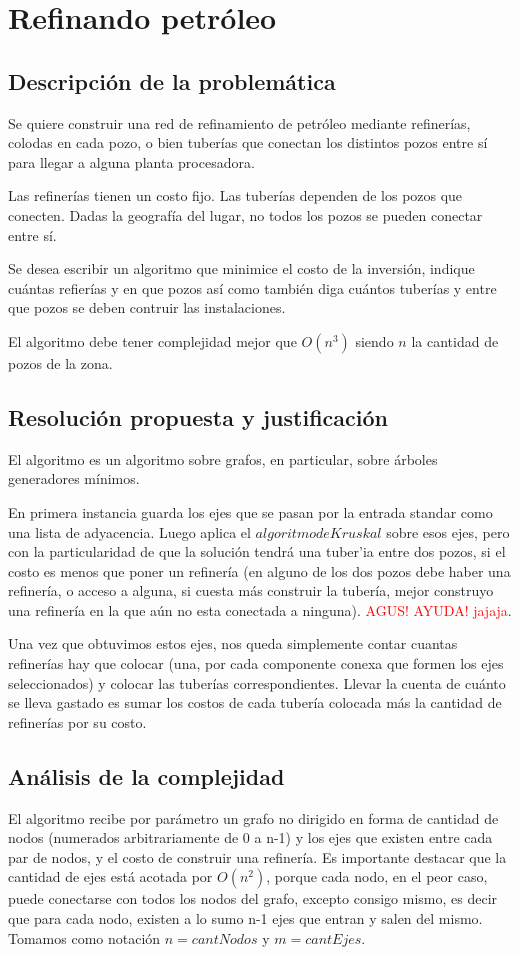 \section{Refinando petr\'oleo}
\subsection{Descripci\'on de la problem\'atica}
	Se quiere construir una red de refinamiento de petr\'oleo mediante refiner\'ias, colodas en cada pozo, o bien tuber\'ias que conectan los distintos pozos entre s\'i para llegar a alguna planta procesadora.
	
	Las refiner\'ias tienen un costo fijo. Las tuber\'ias dependen de los pozos que conecten. Dadas la geograf\'ia del lugar, no todos los pozos se pueden conectar entre s\'i.
	
	Se desea escribir un algoritmo que minimice el costo de la inversi\'on, indique cu\'antas refier\'ias y en que pozos as\'i como tambi\'en diga cu\'antos tuber\'ias y entre que pozos se deben contruir las instalaciones.
	
	El algoritmo debe tener complejidad mejor que $O(n^3)$ siendo $n$ la cantidad de pozos de la zona.

\subsection{Resoluci\'on propuesta y justificaci\'on}
	El algoritmo es un algoritmo sobre grafos, en particular, sobre \'arboles generadores m\'inimos.
	
	En primera instancia guarda los ejes que se pasan por la entrada standar como una lista de adyacencia. Luego aplica el $algoritmo de Kruskal$ sobre esos ejes, pero con la particularidad de que la soluci\'on tendr\'a una tuber'ia entre dos pozos, si el costo es menos que poner un refiner\'ia (en alguno de los dos pozos debe haber una refiner\'ia, o acceso a alguna, si cuesta m\'as construir la tuber\'ia, mejor construyo una refiner\'ia en la que a\'un no esta conectada a ninguna). \textcolor{red}{AGUS! AYUDA! jajaja}.
	
	Una vez que obtuvimos estos ejes, nos queda simplemente contar cuantas refiner\'ias hay que colocar (una, por cada componente conexa que formen los ejes seleccionados) y colocar las tuber\'ias correspondientes. Llevar la cuenta de cu\'anto se lleva gastado es sumar los costos de cada tuber\'ia colocada m\'as la cantidad de refiner\'ias por su costo.

\subsection{An\'alisis de la complejidad}
	El algoritmo recibe por par\'ametro un grafo no dirigido en forma de cantidad de nodos (numerados arbitrariamente de 0 a n-1) y los ejes que existen entre cada par de nodos, y el costo de construir una refiner\'ia. Es importante destacar que la cantidad de ejes est\'a acotada por $O(n^2)$, porque cada nodo, en el peor caso, puede conectarse con todos los nodos del grafo, excepto consigo mismo, es decir que para cada nodo, existen a lo sumo n-1 ejes que entran y salen del mismo. Tomamos como notaci\'on $n = cantNodos$ y $m = cantEjes$.
	
